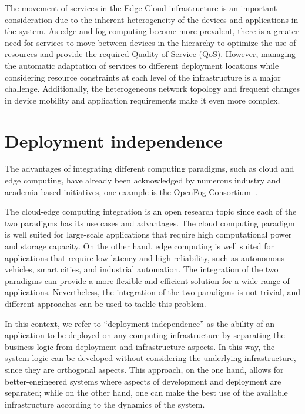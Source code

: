 The movement of services in the Edge-Cloud infrastructure is an important consideration due to the inherent heterogeneity of the devices and
applications in the system. As edge and fog computing become more prevalent, there is a greater need for services to move between devices in the
hierarchy to optimize the use of resources and provide the required Quality of Service (QoS). However, managing the automatic adaptation of
services to different deployment locations while considering resource constraints at each level of the infrastructure is a major
challenge. Additionally, the heterogeneous network topology and frequent changes in device mobility and application requirements make it even more
complex.


\section{Deployment independence}
\label{sec:deployment-independence}

The advantages of integrating different computing paradigms, such as cloud and edge computing, have already been acknowledged by numerous
industry and academia-based initiatives, one example is the OpenFog Consortium~\cite{opc}.

The cloud-edge computing integration is an open research topic since each of the two paradigms has its use cases and advantages. The cloud
computing paradigm is well suited for large-scale applications that require high computational power and storage capacity. On the other hand, edge
computing is well suited for applications that require low latency and high reliability, such as autonomous vehicles, smart cities, and industrial
automation. The integration of the two paradigms can provide a more flexible and efficient solution for a wide range of applications.
Nevertheless, the integration of the two paradigms is not trivial, and different approaches can be used to tackle this problem.

In this context, we refer to ``deployment independence'' as the ability of an application to be deployed on any computing infrastructure by
separating the business logic from deployment and infrastructure aspects. In this way, the system logic can be developed without considering the
underlying infrastructure, since they are orthogonal aspects. This approach, on the one hand, allows for better-engineered systems where aspects of
development and deployment are separated; while on the other hand, one can make the best use of the available infrastructure according to the
dynamics of the system.

